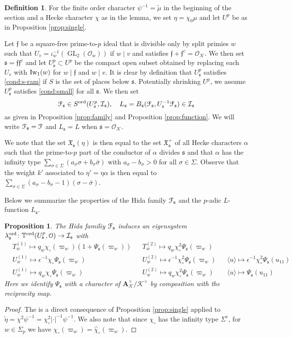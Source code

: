 \documentclass[leqno]{amsart}
\newtheorem{prop}[thm]{Proposition}
\theoremstyle{definition}
\newtheorem{defn}[thm]{Definition}
\theoremstyle{remark}
\newcommand{\oo}{\mathcal{O}}
\newcommand{\eo}{\EuScript{O}}
\newcommand{\A}{\mathbf A}
\DeclareMathOperator{\GL}{GL}
\newcommand{\ff}{\mathfrak{f}}
\newcommand{\fs}{\mathfrak{s}}
\newcommand{\K}{{\mathcal{K}}} %
\newcommand{\fX}{\mathfrak{X}}
\newcommand{\Iw}{\textnormal{Iw}} %
\newcommand{\TT}{\mathbb{T}} %
\newcommand{\euF}{\EuScript{F}} %
\newcommand{\I}{\mathcal{I}} %
\newcommand{\ord}{\textnormal{ord}} %
\begin{document}
\begin{defn}\label{def:family_at_s}
For the finite order character
$\psi^{-1}=\tilde{\mu}$
in the beginning of the section
and a Hecke character $\chi$ as in the lemma,
we set $\eta=\chi_0\mu$
and let $U^p$ be as in Proposition \ref{prop:single}.

Let $\ff$ be a square-free prime-to-$p$ ideal
that is divisible only by split primies $w$
such that $U_v=\iota_w^{-1}(\GL_2(\oo_w))$
if $w\mid v$ and satisfies $\ff+\ff^c=\oo_\K$.
We then set $\fs=\ff\ff^c$ and 
let $U^p_\fs\subset U^p$ be the compact open subset
obtained by replacing each $U_v$ with $\Iw_1(w)$
for $w\mid\ff$ and $w\mid v$.
It is clear by definition that $U^p_\fs$
satisfies \eqref{cond:s-ram} 
if $S$ is the set of places below $\fs$.
Potentially shrinking $U^p$, we assume $U^p_{\fs}$
satisfies \eqref{cond:small} for all $\fs$. 
We then set
\[
    \euF_{\fs}\in 
    S^{\ord}(U^p_{\fs},\I_\fs),\quad
    L_\fs=B_\fs(\euF_{\fs}, U_\fs^{-1}\euF_{\fs})
    \in \I_\fs
\]
as given in Proposition \ref{prop:family} and
Proposition \ref{prop:function}.
We will write $\euF_\fs=\euF$ and $L_\fs=L$
when $\fs=\oo_\K$.


We note that the set $\fX_\fs(\eta)$ is then
equal to the set $\fX_\fs^+$ of all Hecke characters $\alpha$
such that the prime-to-$p$ part of the conductor
of $\alpha$ divides $\fs$ 
and that $\alpha$ has the infinity type
$\sum_{\sigma\in\Sigma}(a_\sigma\sigma+b_\sigma\bar{\sigma})$
with $a_\sigma-b_\sigma>0$ for all $\sigma\in \Sigma$.
Observe that the weight $k'$ associated to $\eta'=\eta\alpha$
is then equal to 
$\sum_{\sigma\in\Sigma}(a_\sigma-b_\sigma-1)(\sigma-\bar{\sigma})$.
\end{defn}

Below we summarize the properties of 
the Hida family $\euF_\fs$ and the $p$-adic $L$-function $L_\fs$.


\begin{prop}\label{prop:eigensystem}
The Hida familiy $\euF_\fs$ induces an eigensystem
$\lambda_{\fs}^{\ord}\colon \TT^{\ord}(U^p_\fs,\eo)\to\I_\fs$ with
\begin{align*}
&T_w^{(1)}\mapsto
q_w\chi_\circ(\varpi_w)(1+\Psi_\fs(\varpi_w))&
&T_w^{(2)}\mapsto q_w\chi_\circ^2\Psi_\fs(\varpi_w)\\
&U_{w}^{(1)}\mapsto
\epsilon^{-1}\chi_\circ\Psi_\fs(\varpi_w)&
&U_{w}^{(2)}\mapsto
\epsilon^{-1}\chi_\circ^2\Psi_\fs(\varpi_w)&
&\langle u\rangle\mapsto
\epsilon^{-1}\chi_\circ^2\Psi_\fs(u_{11})\\
&U_{w}^{(1)}\mapsto q_w\chi_\circ\Psi_\fs(\varpi_w)&
&U_{w}^{(2)}\mapsto q_w\chi_\circ^2\Psi_\fs(\varpi_w)&
&\langle u\rangle\mapsto \Psi_\fs(u_{11})
\end{align*}
Here we identify $\Psi_\fs$ with a character of 
$\A_{\K}^\times/\K^\times$ by composition with the 
reciprocity map.
\end{prop}
\begin{proof}
The is a direct consequence of Proposition \ref{prop:single}
applied to 
$\tilde{\eta}=\chi^2\psi^{-1}=\chi_\circ^2|\cdot|^{-1}\psi^{-1}$.
We also note that since $\chi_\circ$ has the infinity type $\Sigma^c$,
for $w\in \Sigma_p$ we have 
$\chi_\circ(\varpi_w)=\hat{\chi}_\circ(\varpi_w)$.
\end{proof}
\end{document}
